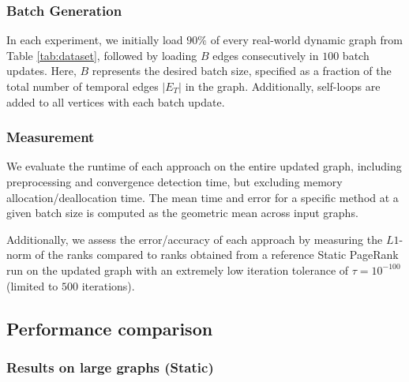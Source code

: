 


\subsubsection{Batch Generation}
\label{sec:batch-generation}

In each experiment, we initially load $90\%$ of every real-world dynamic graph from Table \ref{tab:dataset}, followed by loading $B$ edges consecutively in $100$ batch updates. Here, $B$ represents the desired batch size, specified as a fraction of the total number of temporal edges $|E_T|$ in the graph. Additionally, self-loops are added to all vertices with each batch update.


\subsubsection{Measurement}
\label{sec:measurement}

We evaluate the runtime of each approach on the entire updated graph, including preprocessing and convergence detection time, but excluding memory allocation/deallocation time. The mean time and error for a specific method at a given batch size is computed as the geometric mean across input graphs. Additionally, we assess the error/accuracy of each approach by measuring the $L1$-norm \cite{ohsaka2015efficient} of the ranks compared to ranks obtained from a reference Static PageRank run on the updated graph with an extremely low iteration tolerance of $\tau = 10^{-100}$ (limited to $500$ iterations).




\subsection{Performance comparison}

\subsubsection{Results on large graphs (Static)}

